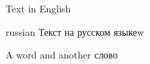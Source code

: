 \documentclass{article}
\begin{document}
Text in English

\begin{otherlanguage*}{russian}
Текст на русском языкеw
\end{otherlanguage*}

A word and another \foreignlanguage{russian}{слово}
\end{document}
